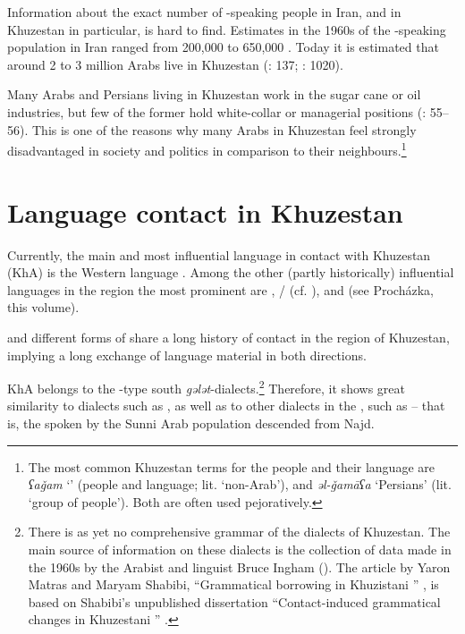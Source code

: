 \documentclass[output=paper,nonflat]{langsci/langscibook}
\begin{document}
In{formation} about the exact number of -speaking people in Iran, and in Khuzestan in particular, is hard to find. Estimates in the 1960s of the -speaking population in Iran ranged from 200,000 to 650,000 \citep[216]{Oberling1986}. Today it is estimated that around 2 to 3 million Arabs live in Khuzestan (\citealt{MatrasShabibi2007}: 137; \citealt{Gazsi2011}: 1020). 

Many Arabs and Persians living in Khuzestan work in the sugar cane or oil industries, but few of the former hold white-collar or managerial positions (\citealt{DePlanhol1986}: 55–56). This is one of the reasons why many Arabs in Khuzestan feel strongly disadvantaged in society and politics in comparison to their  neighbours.\footnote{The most common Khuzestan  terms for the  people and their language are \textit{ʕaǧam} ‘' (people and language; lit. `non-Arab'), and \textit{əl-ǧamāʕa} ‘Persians’ (lit. `group of people'). Both are often used pejoratively.} 

\section{Language contact in Khuzestan}

Currently, the main and most influential language in contact with Khuzestan  (KhA) is the {Western}  language . Among the other (partly historically) influential languages in the region the most prominent are , / (cf. \citealt{Ingham2005}), and  (see Procházka, this volume).

 and different forms of  share a long history of contact in the region of Khuzestan, implying a long exchange of language material in both directions. 

KhA belongs to the -type south  \textit{gələt}-dialects.\footnote{There is as yet no comprehensive grammar of the dialects of Khuzestan. The main source of information on these dialects is the collection of data made in the 1960s by the Arabist and linguist Bruce Ingham (\citeyear{Ingham1973,Ingham1976,Ingham2011khuz}). The {article} by Yaron Matras and Maryam Shabibi, “Grammatical borrowing in Khuzistani ” \citep{MatrasShabibi2007}, is based on Shabibi’s unpublished dissertation “Contact-induced grammatical changes in Khuzestani ” \citep{Shabibi2006}.} Therefore, it shows great similarity to  dialects such as  , as well as to other dialects in the , such as    – that is, the  spoken by the Sunni Arab population descended from Najd. 
\end{document}

